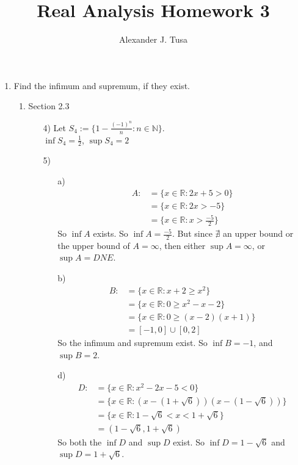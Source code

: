 \documentclass[12pt,letterpaper]{article}
\author{Alexander J. Tusa}
\title{Real Analysis Homework 3}
\theoremstyle{case}
\begin{document}
	\maketitle
	\begin{enumerate}
		\item Find the infimum and supremum, if they exist.
		\begin{enumerate}
			\item Section 2.3
			\begin{enumerate}
				\item[4)] Let $S_4 := \{1-\frac{(-1)^n}{n}: n \in \mathbb{N}\}$. 
				\\$\inf S_4 = \frac{1}{2}$, $\sup S_4 = 2$
				\item[5)] 
				\begin{enumerate}
					\item[a)]
					\begin{align*}
					A :&= \{x \in \mathbb{R}: 2x + 5 > 0\}
					\\ &= \{x \in \mathbb{R}: 2x > -5\}
					\\ &= \{x \in \mathbb{R}: x > \frac{-5}{2}\}
					\end{align*}
					So $\inf A$ exists. So $\inf A = \frac{-5}{2}$. But since $\nexists$ an upper bound or the upper bound of $A = \infty$, then either $\sup A = \infty$, or $\sup A = DNE$.
					\item[b)]
					\begin{align*}
					B :&= \{x \in \mathbb{R}: x + 2 \geq x^2\}
					\\ &= \{x \in \mathbb{R}: 0 \geq x^2-x-2\}
					\\ &= \{x \in \mathbb{R}: 0 \geq (x-2)(x+1)\}
					\\ &= [-1, 0]\cup[0,2]
					\end{align*}
					So the infimum and supremum exist. So $\inf B = -1$, and $\sup B = 2$.
					\item[d)]
					\begin{align*}
					D :&= \{x \in \mathbb{R}: x ^2-2x-5 < 0\}
					\\ &= \{x \in \mathbb{R}: (x-(1 + \sqrt{6}))(x-(1-\sqrt{6}))\}
					\\ &= \{x \in \mathbb{R}: 1 -\sqrt{6} < x < 1 + \sqrt{6}\}
					\\ &= (1-\sqrt{6}, 1+\sqrt{6})
					\end{align*}
					So both the $\inf D$ and $\sup D$ exist. So $\inf D = 1 - \sqrt{6}$ and $\sup D = 1 + \sqrt{6}$.
				\end{enumerate}
			\end{enumerate}

\end{enumerate}
\end{enumerate}
\end{document}
